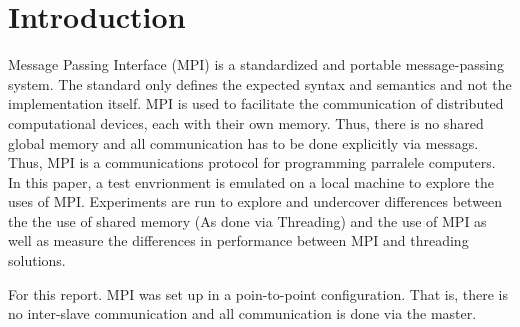 \section{Introduction}
Message Passing Interface (MPI) is a standardized and portable message-passing system. The standard only defines the expected syntax and semantics and not the implementation itself. MPI is used to facilitate the communication of distributed computational devices, each with their own memory. Thus, there is no shared global memory and all communication has to be done explicitly via messags. Thus, MPI is a communications protocol for programming parralele computers. In this paper, a test envrionment is emulated on a local machine to explore the uses of MPI. Experiments are run to explore and undercover differences between the the use of shared memory (As done via Threading) and the use of MPI as well as measure the differences in performance between MPI and threading solutions.

For this report. MPI was set up in a poin-to-point configuration. That is, there is no inter-slave communication and all communication is done via the master.
